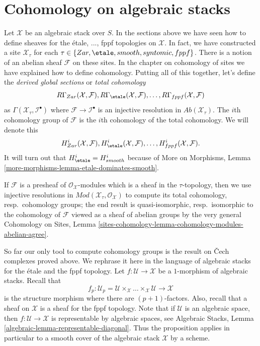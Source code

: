 \section{Cohomology on algebraic stacks}
\label{stacks-sheaves-section-cohomology}
Let $\mathcal{X}$ be an algebraic stack over $S$. In the sections above
we have seen how to define sheaves for the \'etale, ..., fppf
topologies on $\mathcal{X}$. In fact, we have constructed a site
$\mathcal{X}_\tau$ for each $\tau \in \{Zar, \etale, smooth, syntomic,
fppf\}$. There is a notion of an abelian sheaf $\mathcal{F}$ on these sites.
In the chapter on cohomology of sites we have explained how to define
cohomology. Putting all of this together, let's define the
{\it derived global sections} or {\it total cohomology}
$$
R\Gamma_{Zar}(\mathcal{X}, \mathcal{F}),
R\Gamma_\etale(\mathcal{X}, \mathcal{F}), \ldots,
R\Gamma_{fppf}(\mathcal{X}, \mathcal{F})
$$
as $\Gamma(\mathcal{X}_\tau, \mathcal{I}^\bullet)$ where
$\mathcal{F} \to \mathcal{I}^\bullet$ is an injective resolution
in $\textit{Ab}(\mathcal{X}_\tau)$. The $i$th cohomology group of $\mathcal{F}$
is the $i$th cohomology of the total cohomology. We will denote
this
$$
H^i_{Zar}(\mathcal{X}, \mathcal{F}),
H^i_\etale(\mathcal{X}, \mathcal{F}), \ldots,
H^i_{fppf}(\mathcal{X}, \mathcal{F}).
$$
It will turn out that $H^i_\etale = H^i_{smooth}$ because of
More on Morphisms, Lemma \ref{more-morphisms-lemma-etale-dominates-smooth}.

\medskip\noindent
If $\mathcal{F}$ is a presheaf of $\mathcal{O}_\mathcal{X}$-modules
which is a sheaf in the $\tau$-topology, then we use injective
resolutions in $\textit{Mod}(\mathcal{X}_\tau, \mathcal{O}_\mathcal{X})$
to compute its total cohomology, resp.\ cohomology groups;
the end result is quasi-isomorphic, resp.\ isomorphic to the cohomology
of $\mathcal{F}$ viewed as a sheaf of abelian groups by the very general
Cohomology on Sites, Lemma
\ref{sites-cohomology-lemma-cohomology-modules-abelian-agree}.

\medskip\noindent
So far our only tool to compute cohomology groups is the result on
{\v C}ech complexes proved above. We rephrase it here in the language
of algebraic stacks for the \'etale and the fppf topology. Let
$f : \mathcal{U} \to \mathcal{X}$ be a $1$-morphism of algebraic stacks.
Recall that
$$
f_p : \mathcal{U}_p =
\mathcal{U} \times_\mathcal{X} \ldots \times_\mathcal{X} \mathcal{U}
\longrightarrow
\mathcal{X}
$$
is the structure morphism where there are $(p + 1)$-factors. Also, recall
that a sheaf on $\mathcal{X}$ is a sheaf for the fppf topology. Note
that if $\mathcal{U}$ is an algebraic space, then
$f : \mathcal{U} \to \mathcal{X}$ is representable by algebraic spaces,
see
Algebraic Stacks, Lemma \ref{algebraic-lemma-representable-diagonal}.
Thus the proposition applies in particular to a smooth cover of the
algebraic stack $\mathcal{X}$ by a scheme.

